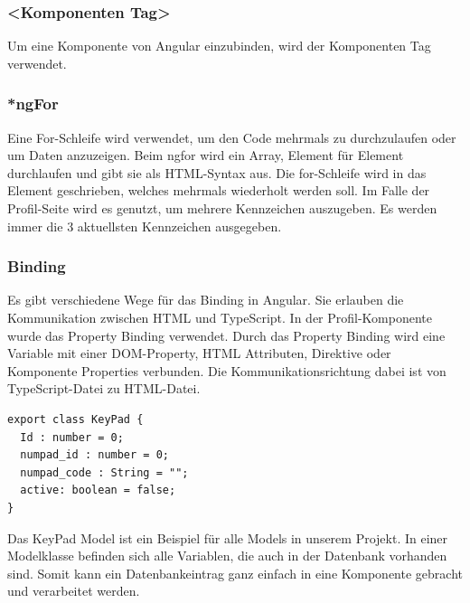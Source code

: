 \subsubsection{<Komponenten Tag>}
Um eine Komponente von Angular einzubinden, wird der Komponenten Tag verwendet. 

\subsubsection{*ngFor}
Eine For-Schleife wird verwendet, um den Code mehrmals zu durchzulaufen oder um Daten anzuzeigen. Beim ngfor wird ein Array, Element für Element durchlaufen und gibt sie als HTML-Syntax aus. Die for-Schleife wird in das Element geschrieben, welches mehrmals wiederholt werden soll. Im Falle der Profil-Seite wird es genutzt, um mehrere Kennzeichen auszugeben. Es werden immer die 3 aktuellsten Kennzeichen ausgegeben.
\cite{NgFor}

\subsubsection{Binding}
Es gibt verschiedene Wege für das Binding in Angular. Sie erlauben die Kommunikation zwischen HTML und TypeScript. In der Profil-Komponente wurde das Property Binding verwendet. Durch das Property Binding wird eine Variable mit einer DOM-Property, HTML Attributen, Direktive oder Komponente Properties verbunden. Die Kommunikationsrichtung dabei ist von TypeScript-Datei zu HTML-Datei.
\cite{Binding}
\pagebreak
\begin{lstlisting}[caption=KeyPad Model]
    export class KeyPad {
  Id : number = 0;
  numpad_id : number = 0;
  numpad_code : String = "";
  active: boolean = false;
}
\end{lstlisting}

Das KeyPad Model ist ein Beispiel für alle Models in unserem Projekt. In einer Modelklasse befinden sich alle Variablen, die auch in der Datenbank vorhanden sind. Somit kann ein Datenbankeintrag ganz einfach in eine Komponente gebracht und verarbeitet werden. 

